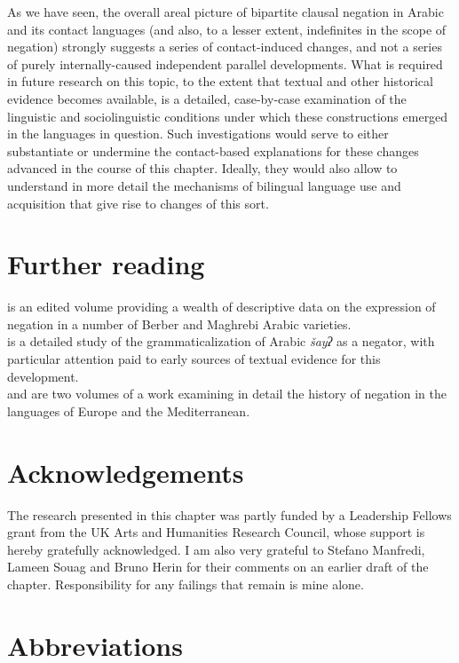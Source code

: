 \documentclass[output=paper]{langsci/langscibook}
\begin{document}
As we have seen, the overall areal picture of bipartite clausal negation in Arabic and its contact languages (and also, to a lesser extent, indefinites in the scope of negation) strongly suggests a series of contact-induced changes, and not a series of purely internally-caused independent parallel developments. What is required in future research on this topic, to the extent that textual and other historical evidence becomes available, is a detailed, case-by-case examination of the linguistic and sociolinguistic conditions under which these constructions emerged in the languages in question. Such investigations would serve to either substantiate or undermine the contact-based explanations for these changes advanced in the course of this chapter. Ideally, they would also allow to understand in more detail the mechanisms of bilingual language use and acquisition that give rise to changes of this sort. 

\section*{Further reading}

\citet{ChakerCaubet1996} is an edited volume providing a wealth of descriptive data on the expression of negation in a number of Berber and Maghrebi Arabic varieties.\\
\citet{Diem2014} is a detailed study of the grammaticalization of Arabic \textit{šayʔ} as a negator, with particular attention paid to early sources of textual evidence for this development.\\
\citet{WillisBreitbarth2013} and \citet{BreitbarthWillisLucasinpress} are two volumes of a work examining in detail the history of negation in the languages of Europe and the Mediterranean.

\section*{Acknowledgements}

The research presented in this chapter was partly funded by a Leadership Fellows grant from the UK Arts and Humanities Research Council, whose support is hereby gratefully acknowledged. I am also very grateful to Stefano Manfredi, Lameen Souag and Bruno Herin for their comments on an earlier draft of the chapter. Responsibility for any failings that remain is mine alone.

\section*{Abbreviations}
\end{document}

